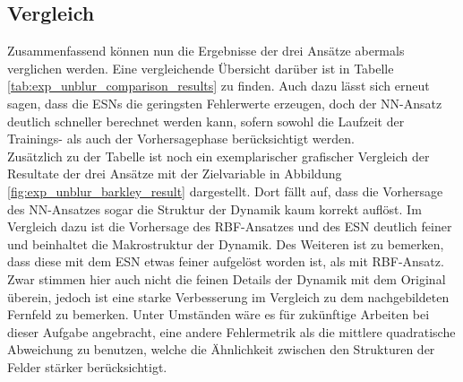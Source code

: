 \FloatBarrier
\subsection{Vergleich}
Zusammenfassend können nun die Ergebnisse der drei Ansätze abermals verglichen werden. Eine vergleichende Übersicht darüber ist in Tabelle \ref{tab:exp_unblur_comparison_results} zu finden. Auch dazu lässt sich erneut sagen, dass die \textsc{ESN}s die geringsten Fehlerwerte erzeugen, doch der \textsc{NN}-Ansatz deutlich schneller berechnet werden kann, sofern sowohl die Laufzeit der Trainings- als auch der Vorhersagephase berücksichtigt werden.\\
Zusätzlich zu der Tabelle ist noch ein exemplarischer grafischer Vergleich der Resultate der drei Ansätze mit der Zielvariable in Abbildung \ref{fig:exp_unblur_barkley_result} dargestellt. Dort fällt auf, dass die Vorhersage des \textsc{NN}-Ansatzes sogar die Struktur der Dynamik kaum korrekt auflöst. Im Vergleich dazu ist die Vorhersage des \textsc{RBF}-Ansatzes und des \textsc{ESN} deutlich feiner und beinhaltet die Makrostruktur der Dynamik. Des Weiteren ist zu bemerken, dass diese mit dem \textsc{ESN} etwas feiner aufgelöst worden ist, als mit \textsc{RBF}-Ansatz. Zwar stimmen hier auch nicht die feinen Details der Dynamik mit dem Original überein, jedoch ist eine starke Verbesserung im Vergleich zu dem nachgebildeten Fernfeld zu bemerken. Unter Umständen wäre es für zukünftige Arbeiten bei dieser Aufgabe angebracht, eine andere Fehlermetrik als die mittlere quadratische Abweichung zu benutzen, welche die Ähnlichkeit zwischen den Strukturen der Felder stärker berücksichtigt. 

